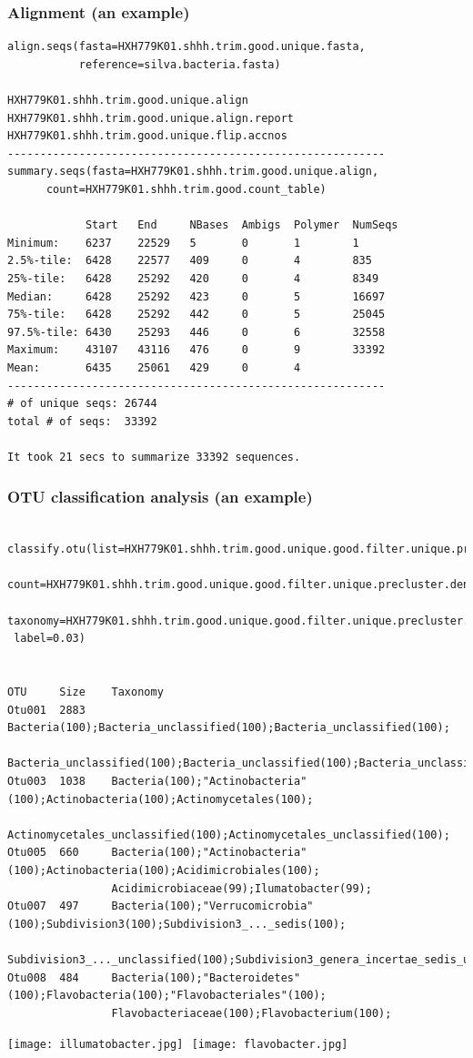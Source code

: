 \documentclass[10pt]{beamer}
\begin{document}
\begin{frame}[fragile]
  \frametitle{Alignment (an example)}
{\footnotesize{}\ttfamily\begin{verbatim}
align.seqs(fasta=HXH779K01.shhh.trim.good.unique.fasta,
           reference=silva.bacteria.fasta)

HXH779K01.shhh.trim.good.unique.align
HXH779K01.shhh.trim.good.unique.align.report
HXH779K01.shhh.trim.good.unique.flip.accnos
----------------------------------------------------------
summary.seqs(fasta=HXH779K01.shhh.trim.good.unique.align,
      count=HXH779K01.shhh.trim.good.count_table)

            Start   End     NBases  Ambigs  Polymer  NumSeqs
Minimum:    6237    22529   5       0       1        1
2.5%-tile:  6428    22577   409     0       4        835
25%-tile:   6428    25292   420     0       4        8349
Median:     6428    25292   423     0       5        16697
75%-tile:   6428    25292   442     0       5        25045
97.5%-tile: 6430    25293   446     0       6        32558
Maximum:    43107   43116   476     0       9        33392
Mean:       6435    25061   429     0       4
----------------------------------------------------------
# of unique seqs: 26744
total # of seqs:  33392

It took 21 secs to summarize 33392 sequences.
\end{verbatim}}
\end{frame}

\begin{frame}[fragile]
  \frametitle{OTU classification analysis (an example)}
{\tiny\ttfamily\begin{verbatim}

classify.otu(list=HXH779K01.shhh.trim.good.unique.good.filter.unique.precluster.pick.pick.opti_mcc.list,
 count=HXH779K01.shhh.trim.good.unique.good.filter.unique.precluster.denovo.vsearch.pick.pick.count_table,
 taxonomy=HXH779K01.shhh.trim.good.unique.good.filter.unique.precluster.pick.rdp.wang.pick.taxonomy,
 label=0.03)


OTU     Size    Taxonomy
Otu001  2883    Bacteria(100);Bacteria_unclassified(100);Bacteria_unclassified(100);
                Bacteria_unclassified(100);Bacteria_unclassified(100);Bacteria_unclassified(100);
Otu003  1038    Bacteria(100);"Actinobacteria"(100);Actinobacteria(100);Actinomycetales(100);
                Actinomycetales_unclassified(100);Actinomycetales_unclassified(100);
Otu005  660     Bacteria(100);"Actinobacteria"(100);Actinobacteria(100);Acidimicrobiales(100);
                Acidimicrobiaceae(99);Ilumatobacter(99);
Otu007  497     Bacteria(100);"Verrucomicrobia"(100);Subdivision3(100);Subdivision3_..._sedis(100);
                Subdivision3_..._unclassified(100);Subdivision3_genera_incertae_sedis_unclassified(100);
Otu008  484     Bacteria(100);"Bacteroidetes"(100);Flavobacteria(100);"Flavobacteriales"(100);
                Flavobacteriaceae(100);Flavobacterium(100);
\end{verbatim}}
  \begin{center}
  \texttt{[image: illumatobacter.jpg]} ${}$
  \texttt{[image: flavobacter.jpg]}
  \end{center}
\end{frame}
\end{document}
